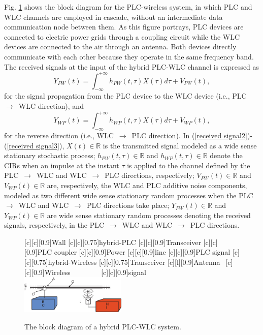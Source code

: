 \documentclass[journal]{IEEEtran}
\begin{document}
Fig. \ref{Hybchannel} shows the block diagram for the \ac{PLC}-wireless system, in which \ac{PLC} and \ac{WLC} channels are employed in cascade, without an intermediate data communication node between them. As this figure portrays, \ac{PLC} devices are connected to electric power grids through a coupling circuit while the \ac{WLC} devices are connected to the air through an antenna. Both devices directly communicate with each other because they operate in the same frequency band. The received signals at the input of the hybrid \ac{PLC}-\ac{WLC} channel is expressed as
\begin{equation} \label{received signal2}
Y_{PW}(t) = \int_{-\infty}^{+\infty} h_{PW}(t,\tau) X(\tau) d\tau + V_{PW}(t),
\end{equation}
for the signal propagation from the \ac{PLC} device to the \ac{WLC} device (i.e., \ac{PLC}~$\rightarrow$~\ac{WLC} direction), and
\begin{equation} \label{received signal3}
Y_{WP}(t) = \int_{-\infty}^{+\infty} h_{WP}(t,\tau) X(\tau) d\tau + V_{WP}(t),
\end{equation}
for the reverse direction (i.e., \ac{WLC}~$\rightarrow$~\ac{PLC} direction). In (\ref{received signal2})-(\ref{received signal3}),  $X(t)\in \mathbb{R}$ is the transmitted signal modeled as a wide sense stationary stochastic process; $h_{PW}(t,\tau)\in \mathbb{R}$ and $h_{WP}(t,\tau)\in \mathbb{R}$ denote the \acp{CIR} when an impulse at the instant $\tau$ is applied to the channel defined by the \ac{PLC}~$\rightarrow$~\ac{WLC} and \ac{WLC}~$\rightarrow$~\ac{PLC} directions, respectively; $V_{PW}(t)\in \mathbb{R}$ and $V_{WP}(t)\in \mathbb{R}$ are, respectively, the \ac{WLC} and \ac{PLC} additive noise components, modeled as two different wide sense stationary random processes when the \ac{PLC}~$\rightarrow$~\ac{WLC} and \ac{WLC}~$\rightarrow$~\ac{PLC} directions take place; $Y_{PW}(t)\in \mathbb{R}$ and ${Y}_{WP}(t)\in \mathbb{R}$ are wide sense stationary random processes denoting the received signals, respectively, in the \ac{PLC}~$\rightarrow$~\ac{WLC} and \ac{WLC}~$\rightarrow$~\ac{PLC} directions.

\begin{figure}[h]
	\centering
	[c][0.9]{Wall}
	[c][0.75]{hybrid-PLC}
	[c][0.9]{Transceiver}
	[c][0.9]{PLC coupler}
	[c][0.9]{Power}
	[c][0.9]{line}
	[c][0.9]{PLC signal}
	[c][0.75]{hybrid-Wireless}
	[c][0.75]{Transceiver}
	[l][0.9]{Antenna$~~$}
	[c][0.9]{Wireless$~~~~~~~~~~~~~~~~~~$}
	[c][0.9]{signal$~~~~~~~~~~~~~~~~~$}
	\includegraphics[width=0.45\textwidth]{images/Hybrid_channel.eps}
	\caption{The block diagram of a hybrid PLC-WLC system.}
	\label{Hybchannel}
\end{figure}
\end{document}
